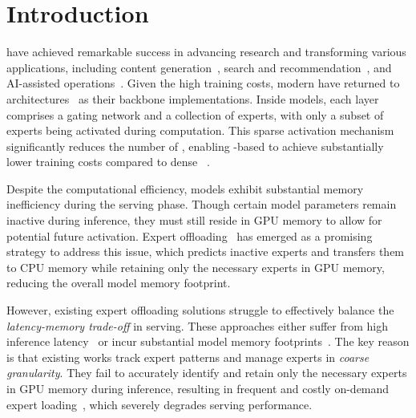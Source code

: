 \section{Introduction}
\label{sec:intro}


\LLMs have achieved remarkable success in advancing \NLP research and transforming various applications, including content generation~\cite{dai2024neural,achiam2023gpt,brown2020language,radford2019language}, search and recommendation~\cite{lin2024data,zhao2024let}, and AI-assisted operations~\cite{nam2024using,li2024go,jiang2024lilac}.
%
Given the high training costs, modern \LLMs have returned to \MoE architectures~\cite{jiang2024mixtral,snowflake-arctic,yang2024qwen2,xai-grok,dai2024deepseekmoe,abdin2024phi} as their backbone implementations. Inside \MoE models, each \MoE layer comprises a gating network and a collection of experts, with only a subset of experts being activated during computation.
%
This sparse activation mechanism significantly reduces the number of \FLOPs, enabling \MoE-based \LLMs to achieve substantially lower training costs compared to dense \LLMs~\cite{dai2024deepseekmoe,yang2024qwen2,jiang2024mixtral}.


Despite the computational efficiency, \MoE models exhibit substantial memory inefficiency during the serving phase. Though certain model parameters remain inactive during inference, they must still reside in GPU memory to allow for potential future activation.
%
Expert offloading~\cite{xue2024moe,song2024promoe,eliseev2023fast,aminabadi2022deepspeed} has emerged as a promising strategy to address this issue, which predicts inactive experts and transfers them to CPU memory while retaining only the necessary experts in GPU memory, reducing the overall model memory footprint.


However, existing expert offloading solutions struggle to effectively balance the \textit{latency-memory trade-off} in \MoE serving. These approaches either suffer from high inference latency~\cite{aminabadi2022deepspeed,song2024promoe} or incur substantial model memory footprints~\cite{eliseev2023fast,xue2024moe}.
%
The key reason is that existing works track expert patterns and manage experts in \textit{coarse granularity}.
They fail to accurately identify and retain only the necessary experts in GPU memory during inference, resulting in frequent and costly on-demand expert loading~\cite{song2024promoe}, which severely degrades serving performance.


